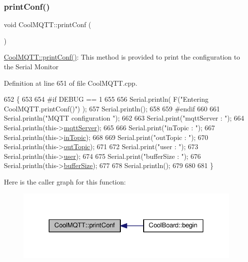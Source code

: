 \subsubsection{\texorpdfstring{print\+Conf()}{printConf()}}
{\footnotesize\ttfamily void Cool\+M\+Q\+T\+T\+::print\+Conf (\begin{DoxyParamCaption}{ }\end{DoxyParamCaption})}

\hyperlink{class_cool_m_q_t_t_a40553a0ad4b5ecf1cb4411ab54ca85fb}{Cool\+M\+Q\+T\+T\+::print\+Conf()}\+: This method is provided to print the configuration to the Serial Monitor 

Definition at line 651 of file Cool\+M\+Q\+T\+T.\+cpp.


\begin{DoxyCode}
652 \{
653 
654 \textcolor{preprocessor}{#if DEBUG == 1 }
655 
656     Serial.println( F(\textcolor{stringliteral}{"Entering CoolMQTT.printConf()"}) );
657     Serial.println();   
658 
659 \textcolor{preprocessor}{#endif}
660     
661     Serial.println(\textcolor{stringliteral}{"MQTT configuration "});
662 
663     Serial.print(\textcolor{stringliteral}{"mqttServer : "});
664     Serial.println(this->\hyperlink{class_cool_m_q_t_t_ab8bb951f87ddbf92db74c2ad16a3e53e}{mqttServer});
665 
666     Serial.print(\textcolor{stringliteral}{"inTopic : "});
667     Serial.println(this->\hyperlink{class_cool_m_q_t_t_a4492f52a441e83cc5151010317fdb52d}{inTopic});
668 
669     Serial.print(\textcolor{stringliteral}{"outTopic : "});
670     Serial.println(this->\hyperlink{class_cool_m_q_t_t_a109c786a17b463f9eeba046194279522}{outTopic});
671 
672     Serial.print(\textcolor{stringliteral}{"user : "});
673     Serial.println(this->\hyperlink{class_cool_m_q_t_t_a8cd47e45d457f908d4b4390b35aaee83}{user});
674 
675     Serial.print(\textcolor{stringliteral}{"bufferSize : "});
676     Serial.println(this->\hyperlink{class_cool_m_q_t_t_a7f3cf26b51d6770f216e42c5ef13ca9f}{bufferSize});
677 
678     Serial.println();
679 
680 
681 \}
\end{DoxyCode}
Here is the caller graph for this function\+:\nopagebreak
\begin{figure}[H]
\begin{center}
\leavevmode
\includegraphics[width=318pt]{d0/dd0/class_cool_m_q_t_t_a40553a0ad4b5ecf1cb4411ab54ca85fb_icgraph}
\end{center}
\end{figure}
\mbox{\label{class_cool_m_q_t_t_ace977b3e90ab14b1199fe5c4fb0a13ec}} 
